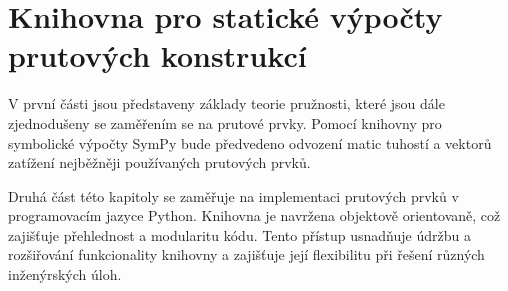 \chapter{Knihovna pro statické výpočty prutových konstrukcí}

V první části jsou představeny základy teorie pružnosti, které jsou dále zjednodušeny se zaměřením se na prutové prvky. Pomocí knihovny pro symbolické výpočty SymPy\cite{sympy} bude předvedeno odvození matic tuhostí a vektorů zatížení nejběžněji používaných prutových prvků.

Druhá část této kapitoly se zaměřuje na implementaci prutových prvků v programovacím jazyce Python. Knihovna je navržena objektově orientovaně, což zajišťuje přehlednost a modularitu kódu. Tento přístup usnadňuje údržbu a rozšiřování funkcionality knihovny a zajišťuje její flexibilitu při řešení různých inženýrských úloh.










